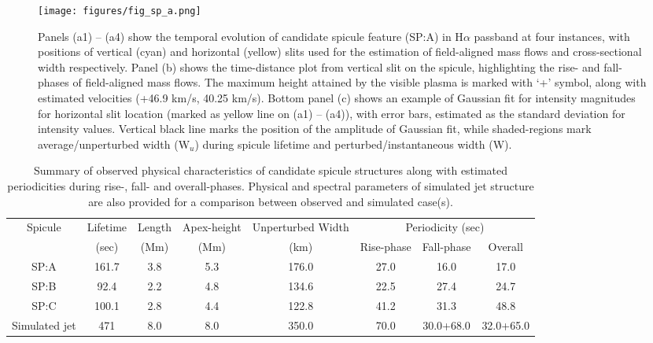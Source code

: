 \begin{figure*}
\texttt{[image: figures/fig\_sp\_a.png]}
\caption{Panels (a1) – (a4) show the temporal evolution of candidate spicule feature (SP:A) in H$\alpha$ passband at four instances, with positions of vertical (cyan) and horizontal (yellow) slits used for the estimation of field-aligned mass flows and cross-sectional width respectively. Panel (b) shows the time-distance plot from vertical slit on the spicule, highlighting the rise- and fall-phases of field-aligned mass flows. The maximum height attained by the visible plasma is marked with ‘+’ symbol, along with estimated velocities (+46.9 km/s, 40.25 km/s). Bottom panel (c) shows an example of Gaussian fit for intensity magnitudes for horizontal slit location (marked as yellow line on (a1) – (a4)), with error bars, estimated as the standard deviation for intensity values. Vertical black line marks the position of the amplitude of Gaussian fit, while shaded-regions mark average/unperturbed width (W$_{u}$) during spicule lifetime and perturbed/instantaneous width (W).}
\label{fig:1} 
\end{figure*}
\begin{table*}
\caption{Summary of observed physical characteristics of candidate spicule structures along with estimated periodicities during rise-, fall- and overall-phases. Physical and spectral parameters of simulated jet structure are also provided for a comparison between observed and simulated case(s). }             
\label{table:1}      
\begin{center}
\begin{tabular}{cccccccc}
\hline
Spicule       & Lifetime & Length & Apex-height & Unperturbed Width & \multicolumn{3}{c}{Periodicity (sec)} \\ \cline{6-8} 
              & (sec)    & (Mm)   & (Mm)        & (km)              & Rise-phase  & Fall-phase  & Overall   \\ \hline
SP:A          & 161.7    & 3.8    & 5.3         & 176.0             & 27.0        & 16.0        & 17.0      \\
SP:B          & 92.4     & 2.2    & 4.8         & 134.6             & 22.5        & 27.4        & 24.7      \\
SP:C          & 100.1    & 2.8    & 4.4         & 122.8             & 41.2        & 31.3        & 48.8      \\ \hline
Simulated jet & 471      & 8.0    & 8.0         & 350.0             & 70.0        & 30.0+68.0   & 32.0+65.0 \\ \hline
\end{tabular}
\end{center}
\end{table*}

